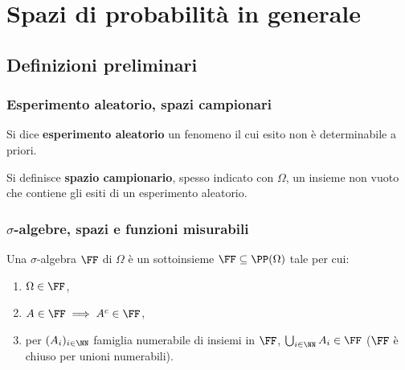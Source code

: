 \chapter{Spazi di probabilità in generale}
\setlength{\parindent}{2pt}

\begin{multicols*}{2}
    \section{Definizioni preliminari}

    \subsection{Esperimento aleatorio, spazi campionari}

    \begin{definition}
        Si dice \textbf{esperimento aleatorio} un fenomeno il cui esito
        non è determinabile a priori.
    \end{definition}
    
    \begin{definition}
        Si definisce \textbf{spazio campionario}, spesso indicato con
        $\Omega$, un insieme non vuoto che contiene gli
        esiti di un esperimento aleatorio.
    \end{definition}

    \subsection{\texorpdfstring{$\sigma$}{σ}-algebre, spazi e funzioni misurabili}

    \begin{definition}
        Una $\sigma$-algebra $\FF$ di $\Omega$ è un sottoinsieme $\FF \subseteq \PP(\Omega)$ tale per cui:

        \begin{enumerate}[(i.)]
            \item $\Omega \in \FF$,
            \item $A \in \FF \implies A^c \in \FF$,
            \item per $(A_i)_{i \in \NN}$ famiglia numerabile di insiemi
                in $\FF$, $\bigcup_{i \in \NN} A_i \in \FF$ ($\FF$ è chiuso per unioni numerabili).
        \end{enumerate}
    \end{definition}


\end{multicols*}
